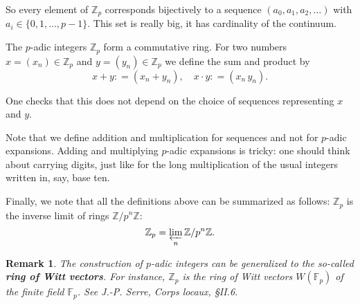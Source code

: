 \documentclass{article}
\newcommand{\term}{\textbf}
\newcommand{\dfn}{\mathrel{\mathop:}=}
\newcommand{\ZZ}{\mathbb{Z}}
\newcommand{\FF}{\mathbb{F}}
\theoremstyle{myplain}
\theoremstyle{mydefinition}
\newtheorem{remark}[proposition]{Remark}
\begin{document}
So every element of $\ZZ_p$ corresponds bijectively to a sequence
$(a_0,a_1,a_2,\ldots)$ with $a_i \in \{ 0, 1, \ldots, p-1 \}$. This set is
really big, it has cardinality of the continuum.

The $p$-adic integers $\ZZ_p$ form a commutative ring. For two numbers
$x = (x_n) \in \ZZ_p$ and $y = (y_n) \in \ZZ_p$ we define the sum and product by
$$x+y \dfn (x_n + y_n), \quad x\cdot y \dfn (x_n\,y_n).$$

One checks that this does not depend on the choice of sequences representing $x$
and $y$.

\vspace{1em}

Note that we define addition and multiplication for sequences and not for
$p$-adic expansions. Adding and multiplying $p$-adic expansions is tricky: one
should think about carrying digits, just like for the long multiplication of the
usual integers written in, say, base ten.

\vspace{2em}

Finally, we note that all the definitions above can be summarized as follows:
$\ZZ_p$ is the inverse limit of rings $\ZZ/p^n\ZZ$:
$$\ZZ_p = \varprojlim_n \ZZ/p^n\ZZ.$$

\begin{remark}
  The construction of $p$-adic integers can be generalized to the so-called
  \term{ring of Witt vectors}. For instance, $\ZZ_p$ is the ring of Witt vectors
  $W (\FF_p)$ of the finite field $\FF_p$. See
  \emph{J.-P. Serre, Corps locaux, \S II.6}.
\end{remark}
\end{document}
